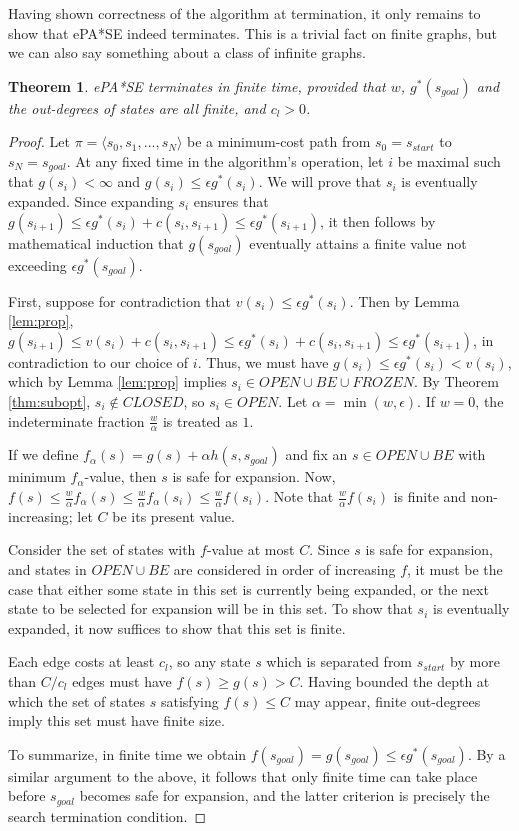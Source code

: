 \documentclass[letterpaper]{article}
\newtheorem{thm}{Theorem}
\begin{document}
Having shown correctness of the algorithm at termination, it only remains to show that ePA*SE indeed terminates. This is a trivial fact on finite graphs, but we can also say something about a class of infinite graphs.

\begin{thm}
\label{thm:complete}
ePA*SE terminates in finite time, provided that $w$, $g^*(s_{goal})$ and the out-degrees of states are all finite, and $c_l > 0$.
\end{thm}

\begin{proof}

Let $\pi = \langle s_0,s_1,\ldots,s_N \rangle$ be a minimum-cost path from $s_0 = s_{start}$ to $s_N = s_{goal}$. At any fixed time in the algorithm's operation, let $i$ be maximal such that $g(s_i)<\infty$ and $g(s_i)\le\epsilon g^*(s_i)$. We will prove that $s_i$ is eventually expanded. Since expanding $s_i$ ensures that $g(s_{i+1})\le \epsilon g^*(s_i)+c(s_i,s_{i+1})\le\epsilon g^*(s_{i+1})$, it then follows by mathematical induction that $g(s_{goal})$ eventually attains a finite value not exceeding $\epsilon g^*(s_{goal})$.

First, suppose for contradiction that $v(s_i)\le \epsilon g^*(s_i)$. Then by Lemma \ref{lem:prop}, $g(s_{i+1}) \le v(s_i)+c(s_i,s_{i+1})\le\epsilon g^*(s_i)+c(s_i,s_{i+1})\le\epsilon g^*(s_{i+1})$, in contradiction to our choice of $i$. Thus, we must have $g(s_i)\le\epsilon g^*(s_i)<v(s_i)$, which by Lemma \ref{lem:prop} implies $s_i\in OPEN\cup BE\cup FROZEN$. By Theorem \ref{thm:subopt}, $s_i\notin CLOSED$, so $s_i\in OPEN$. Let $\alpha = \min(w,\epsilon)$. If $w=0$, the indeterminate fraction $\frac w\alpha$ is treated as $1$.

If we define $f_\alpha(s) = g(s) + \alpha h(s,s_{goal})$ and fix an $s\in OPEN\cup BE$ with minimum $f_\alpha$-value, then $s$ is safe for expansion. Now, $f(s) \le \frac w\alpha f_\alpha(s) \le \frac w\alpha f_\alpha(s_i) \le \frac w\alpha f(s_i)$. Note that $\frac w\alpha f(s_i)$ is finite and non-increasing; let $C$ be its present value.

Consider the set of states with $f$-value at most $C$. Since $s$ is safe for expansion, and states in $OPEN\cup BE$ are considered in order of increasing $f$, it must be the case that either some state in this set is currently being expanded,  or the next state to be selected for expansion will be in this set. To show that $s_i$ is eventually expanded, it now suffices to show that this set is finite.

Each edge costs at least $c_l$, so any state $s$ which is separated from $s_{start}$ by more than $C/c_l$ edges must have $f(s) \ge g(s) > C$. Having bounded the depth at which the set of states $s$ satisfying $f(s) \le C$ may appear, finite out-degrees imply this set must have finite size.

To summarize, in finite time we obtain $f(s_{goal}) = g(s_{goal}) \le \epsilon g^*(s_{goal})$. By a similar argument to the above, it follows that only finite time can take place before $s_{goal}$ becomes safe for expansion, and the latter criterion is precisely the search termination condition.
\end{proof}
\end{document}
